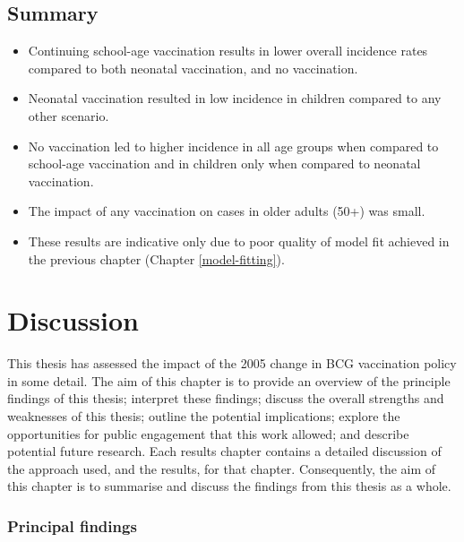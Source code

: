 \documentclass[11pt,twoside]{bristolthesis}
\providecommand{\tightlist}{%
  \setlength{\itemsep}{0pt}\setlength{\parskip}{0pt}}
\begin{document}
  \hypertarget{summary-10}{%
  \section{Summary}\label{summary-10}}
  \begin{itemize}
  \tightlist
  \item
    Continuing school-age vaccination results in lower overall incidence rates compared to both neonatal vaccination, and no vaccination.
  \item
    Neonatal vaccination resulted in low incidence in children compared to any other scenario.
  \item
    No vaccination led to higher incidence in all age groups when compared to school-age vaccination and in children only when compared to neonatal vaccination.
  \item
    The impact of any vaccination on cases in older adults (50+) was small.
  \item
    These results are indicative only due to poor quality of model fit achieved in the previous chapter (Chapter \ref{model-fitting}).
  \end{itemize}
  \hypertarget{discussion-chapt}{%
  \chapter{Discussion}\label{discussion-chapt}}
  
  This thesis has assessed the impact of the 2005 change in BCG vaccination policy in some detail. The aim of this chapter is to provide an overview of the principle findings of this thesis; interpret these findings; discuss the overall strengths and weaknesses of this thesis; outline the potential implications; explore the opportunities for public engagement that this work allowed; and describe potential future research. Each results chapter contains a detailed discussion of the approach used, and the results, for that chapter. Consequently, the aim of this chapter is to summarise and discuss the findings from this thesis as a whole.
  
  \hypertarget{principal-findings}{%
  \subsection{Principal findings}\label{principal-findings}}
  
\end{document}
